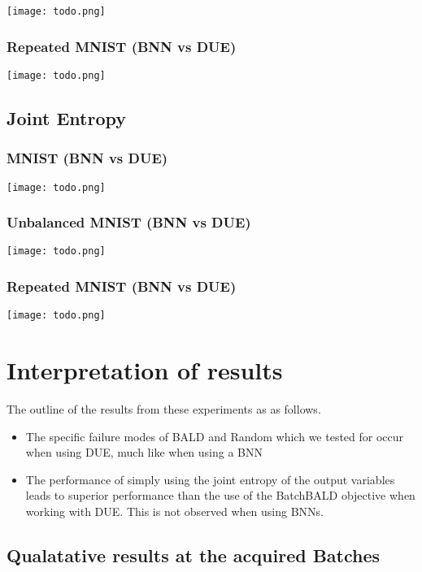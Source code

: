 \documentclass[12pt, a4paper]{report}
\theoremstyle{definition}
\theoremstyle{definition}
\theoremstyle{definition}
\begin{document}
\texttt{[image: todo.png]}

\subsubsection{Repeated MNIST (BNN vs DUE)}

\texttt{[image: todo.png]}


\subsection{Joint Entropy}

\subsubsection{MNIST (BNN vs DUE)}

\texttt{[image: todo.png]}

\subsubsection{Unbalanced MNIST (BNN vs DUE)}

\texttt{[image: todo.png]}

\subsubsection{Repeated MNIST (BNN vs DUE)}

\texttt{[image: todo.png]}




\section{Interpretation of results}

The outline of the results from these experiments as as follows.

\begin{itemize}
    \item The specific failure modes of BALD and Random which we tested for occur when using DUE, much like when using a BNN
    \item The performance of simply using the joint entropy of the output variables leads to superior performance than the use of the BatchBALD objective when working with DUE. This is not observed when using BNNs.
\end{itemize}


\subsection{Qualatative results at the acquired Batches}
\end{document}

